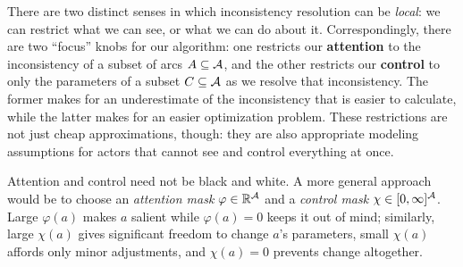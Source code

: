 \documentclass[twoside]{article}
\theoremstyle{plain}
\theoremstyle{definition}
\theoremstyle{remark}
\newcommand\Ctx{\dg{C\mskip-2mut\mskip-2mux}}
\begin{document}
There are two distinct senses in which inconsistency resolution can
   be \emph{local}: we can restrict what we can see, or what we can do about it.
Correspondingly, there are two ``focus'' knobs for our algorithm:
   one restricts our \textbf{attention} to the inconsistency of a subset of arcs $A \subseteq \mathcal A$,
   and the other restricts our \textbf{control} to only the parameters of a subset
   $C
    \subseteq \mathcal A$
     as we resolve that inconsistency.
%
The former makes for an underestimate of the inconsistency that is easier to calculate, while
the latter
makes for an easier optimization problem.
These restrictions are not just cheap approximations, though:
   they are also appropriate modeling assumptions for
   actors that cannot see and control everything at once.


Attention and control need not be black and white.
A more general approach would be to choose
   an \emph{attention mask} $\varphi \in \mathbb R^{\mathcal A}$ and
   a \emph{control mask} $\chi \in [0,\infty]^{\mathcal A}$.
Large $\varphi(a)$ makes $a$ salient while $\varphi(a) \!=\! 0$ keeps it out of mind;
similarly, large $\chi(a)$ gives significant freedom to change $a$'s parameters,
small $\chi(a)$ affords only minor adjustments, and $\chi(a) \!=\! 0$
   prevents change altogether.
%
\end{document}
